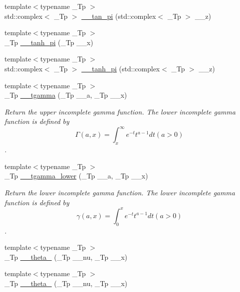 \begin{DoxyCompactItemize}
\item 
{\footnotesize template$<$typename \+\_\+\+Tp $>$ }\\std\+::complex$<$ \+\_\+\+Tp $>$ \hyperlink{namespacestd_1_1____detail_ae19d579db4245c9c4e53a70a0513bb00}{\+\_\+\+\_\+tan\+\_\+pi} (std\+::complex$<$ \+\_\+\+Tp $>$ \+\_\+\+\_\+z)
\item 
{\footnotesize template$<$typename \+\_\+\+Tp $>$ }\\\+\_\+\+Tp \hyperlink{namespacestd_1_1____detail_ab0c02d3c15b8297df52b74807f22169b}{\+\_\+\+\_\+tanh\+\_\+pi} (\+\_\+\+Tp \+\_\+\+\_\+x)
\item 
{\footnotesize template$<$typename \+\_\+\+Tp $>$ }\\std\+::complex$<$ \+\_\+\+Tp $>$ \hyperlink{namespacestd_1_1____detail_a75775747d40813d5d54c0b7a7d0c39f0}{\+\_\+\+\_\+tanh\+\_\+pi} (std\+::complex$<$ \+\_\+\+Tp $>$ \+\_\+\+\_\+z)
\item 
{\footnotesize template$<$typename \+\_\+\+Tp $>$ }\\\+\_\+\+Tp \hyperlink{namespacestd_1_1____detail_ad2f6546e22348b07d992d522153d7d6b}{\+\_\+\+\_\+tgamma} (\+\_\+\+Tp \+\_\+\+\_\+a, \+\_\+\+Tp \+\_\+\+\_\+x)
\begin{DoxyCompactList}\small\item\em Return the upper incomplete gamma function. The lower incomplete gamma function is defined by \[ \Gamma(a,x) = \int_x^\infty e^{-t}t^{a-1}dt (a > 0) \]. \end{DoxyCompactList}\item 
{\footnotesize template$<$typename \+\_\+\+Tp $>$ }\\\+\_\+\+Tp \hyperlink{namespacestd_1_1____detail_ad85ad5ffdb1bab9b1e3b6fd7a114fb0d}{\+\_\+\+\_\+tgamma\+\_\+lower} (\+\_\+\+Tp \+\_\+\+\_\+a, \+\_\+\+Tp \+\_\+\+\_\+x)
\begin{DoxyCompactList}\small\item\em Return the lower incomplete gamma function. The lower incomplete gamma function is defined by \[ \gamma(a,x) = \int_0^x e^{-t}t^{a-1}dt (a > 0) \]. \end{DoxyCompactList}\item 
{\footnotesize template$<$typename \+\_\+\+Tp $>$ }\\\+\_\+\+Tp \hyperlink{namespacestd_1_1____detail_af7f54a82d2e5f0d8758cf53ebb2500e8}{\+\_\+\+\_\+theta\+\_} (\+\_\+\+Tp \+\_\+\+\_\+nu, \+\_\+\+Tp \+\_\+\+\_\+x)
\item 
{\footnotesize template$<$typename \+\_\+\+Tp $>$ }\\\+\_\+\+Tp \hyperlink{namespacestd_1_1____detail_ae783991fe49b94dff4ac9e3ebb446d4f}{\+\_\+\+\_\+theta\+\_} (\+\_\+\+Tp \+\_\+\+\_\+nu, \+\_\+\+Tp \+\_\+\+\_\+x)

\end{DoxyCompactItemize}
